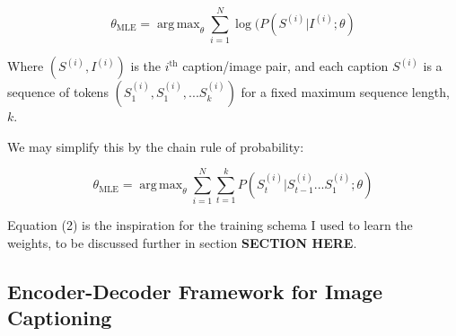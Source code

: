 \documentclass[letterpaper, 10 pt, conference]{ieeeconf}
\DeclareMathOperator*{\argmax}{arg\,max}
\begin{document}
\begin{equation}
\theta_{\text{MLE}} = \argmax_{\theta}{\sum_{i = 1}^N{\log(P(S^{(i)}|I^{(i)}; \theta)}}
\end{equation} 

Where $(S^{(i)}, I^{(i)})$ is the $i^{\text{th}}$ caption/image pair, and each caption $S^{(i)}$ is a sequence of tokens $(S^{(i)}_1, S^{(i)}_1, ... S^{(i)}_k)$ for a fixed maximum sequence length, $k$. 

We may simplify this by the chain rule of probability:

\begin{equation}
\theta_{\text{MLE}} = \argmax_{\theta}{\sum_{i = 1}^N{\sum_{t = 1}^k{P(S_t^{(i)}|S_{t - 1}^{(i)} ... S_{1}^{(i)}; \theta)}}}
\end{equation} 

Equation (2) is the inspiration for the training schema I used to learn the weights, to be discussed further in section \textbf{SECTION HERE}.

\subsection{Encoder-Decoder Framework for Image Captioning}
\end{document}
